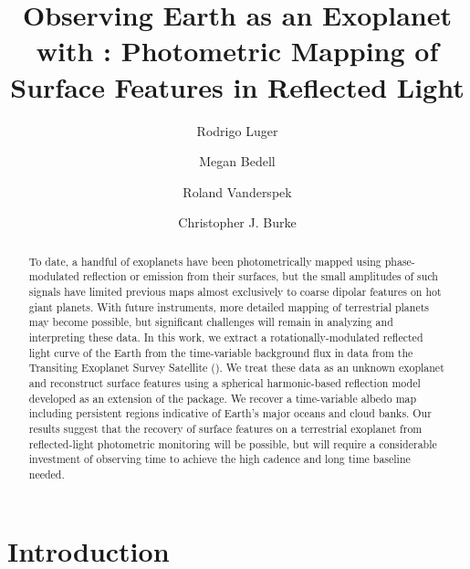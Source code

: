\documentclass[modern]{aastex62}
\begin{document}

\title{Observing Earth as an Exoplanet with \TESS: Photometric Mapping of Surface Features in Reflected Light}

\author[0000-0002-0296-3826]{Rodrigo Luger}
%
\author[0000-0002-9328-5652]{Megan Bedell}
%
\author{Roland Vanderspek}
%
\author{Christopher J. Burke}

\begin{abstract}
To date, a handful of exoplanets have been photometrically mapped using phase-modulated 
reflection or emission from their surfaces, but the small amplitudes 
of such signals have limited previous maps almost exclusively to coarse dipolar
features on hot giant planets. 
With future instruments, more detailed mapping of terrestrial planets may become possible, 
but significant challenges will remain in analyzing and interpreting these data. 
In this work, we extract a rotationally-modulated reflected light curve of the Earth 
from the time-variable background flux in data from the Transiting Exoplanet Survey Satellite (\TESS).
We treat these data as an unknown exoplanet and reconstruct surface features  
using a spherical harmonic-based reflection model developed as an extension of 
the \starry package. We recover a time-variable albedo map including persistent 
regions indicative of Earth's major oceans and cloud banks. 
Our results suggest that the recovery of surface features on a terrestrial exoplanet
from reflected-light photometric monitoring will be possible, but will require
a considerable investment of observing time to achieve the high cadence and 
long time baseline needed.
\href{https://github.com/rodluger/earthshine}{\color{linkcolor}\faGithub}
\end{abstract}


\section{Introduction}
\label{sec:intro}
\end{document}
